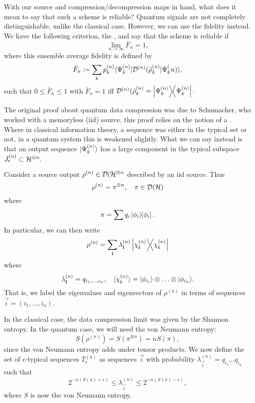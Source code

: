 With our source and compression/decompression maps in hand, what does it mean to say that such a scheme is reliable? Quantum signals are not completely distinguishable, unlike the classical case. However, we can use the fidelity instead. We have the following criterion, the , and say that the scheme is reliable if
\begin{equation}
    \lim_{n\to \infty} \bar F_n =1,
\end{equation}
where this ensemble average fidelity is defined by
\begin{equation}
    \bar F_n := \sum_k p_k^{(n)} \langle\Psi_k^{(n)}\rvert\mathcal{D}^{(n)} (\tilde \rho_k^{(n)} \lvert\Psi_k^({n)}\rangle,
\end{equation}
such that $0\leq \bar F_n \leq 1$ with $\bar F_n = 1$ iff $\mathcal{D}^{(n)}(\tilde \rho_k^{(n)}=\left\lvert{\Psi_k^{(n)}}\middle\rangle\!\middle\langle{\Psi_k^{(n)}}\right\rvert.$

The original proof about quantum data compression was due to Schumacher, who worked with a memoryless (iid) source. this proof relies on the notion of a . Where in classical information theory, a sequence was either in the typical set or not, in a quantum system this is weakened slightly. What we can say instead is that an output sequence $\lvert\Psi_k^{(n)}\rangle$ has a large component in the typical subspace $J_\epsilon^{(n)} \subset \mathcal H^{\otimes n}.$

Consider a source output $\rho^{(n)}\in \mathcal{D}(\mathcal H^{\otimes n}$ described by an iid source. Thus
\begin{equation}
    \rho^{(n)}=\pi^{\otimes n}, \quad \pi\in \mathcal{D}(\mathcal H)
\end{equation}
where
\begin{equation}
    \pi = \sum q_i \left\lvert{\phi_i}\middle\rangle\!\middle\langle{\phi_i}\right\rvert.
\end{equation}
In particular, we can then write
\begin{equation}
    \rho^{(n)}=\sum_{\boldsymbol{\mathbf{i}}} \lambda_{\boldsymbol{\mathbf{i}}}^{(n)} \left\lvert{\chi^{(n)}_{\boldsymbol{\mathbf{i}}}}\middle\rangle\!\middle\langle{\chi^{(n)}_{\boldsymbol{\mathbf{i}}}}\right\rvert
\end{equation}
where
\begin{equation}
    \lambda_{\boldsymbol{\mathbf{i}}}^{(n)}=q_{i_1,\ldots, i_n},\quad \lvert\chi_{\boldsymbol{\mathbf{i}}}^{(n)}\rangle = \lvert\phi_{i_i}\rangle\otimes \ldots \otimes \lvert\phi_{i_n}\rangle.
\end{equation}
That is, we label the eigenvalues and eigenvectors of $\rho^{(n)}$ in terms of sequences $\vec i=(i_1,\ldots,i_n)$.

In the classical case, the data compression limit was given by the Shannon entropy. In the quantum case, we will need the von Neumann entropy:
\begin{equation}
    S(\rho^{(n)})=S(\pi^{\otimes n}) = n S(\pi),
\end{equation}
since the von Neumann entropy adds under tensor products. We now define the set of $\epsilon$-typical sequences $T_\epsilon^{(n)}$ as sequences $\vec i$ with probability $\lambda_{\vec i}^{(n)}=q_{i_1}\ldots q_{i_n}$ such that
\begin{equation}
    2^{-n(S(\pi)+\epsilon)}\leq \lambda_{\vec i}^{(n)} \leq 2^{-n(S(\pi)-\epsilon)},
\end{equation}
where $S$ is now the von Neumann entropy.

